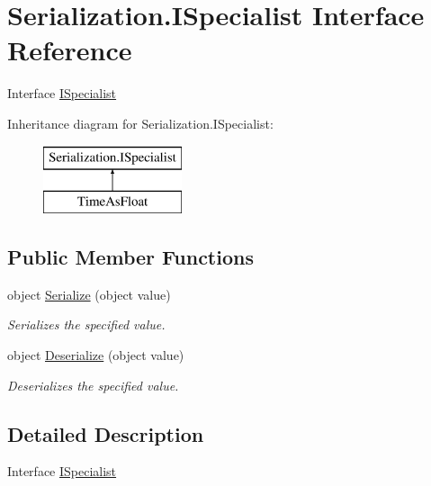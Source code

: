 \hypertarget{interface_serialization_1_1_i_specialist}{}\section{Serialization.\+I\+Specialist Interface Reference}
\label{interface_serialization_1_1_i_specialist}


Interface \hyperlink{interface_serialization_1_1_i_specialist}{I\+Specialist}  


Inheritance diagram for Serialization.\+I\+Specialist\+:\begin{figure}[H]
\begin{center}
\leavevmode
\includegraphics[height=2.000000cm]{interface_serialization_1_1_i_specialist}
\end{center}
\end{figure}
\subsection*{Public Member Functions}
\begin{DoxyCompactItemize}
\item 
object \hyperlink{interface_serialization_1_1_i_specialist_adf11f6ab173de9fe3c26e3cbee292c92}{Serialize} (object value)
\begin{DoxyCompactList}\small\item\em Serializes the specified value. \end{DoxyCompactList}\item 
object \hyperlink{interface_serialization_1_1_i_specialist_a90d5a229aacd71121934630932df0f1a}{Deserialize} (object value)
\begin{DoxyCompactList}\small\item\em Deserializes the specified value. \end{DoxyCompactList}\end{DoxyCompactItemize}


\subsection{Detailed Description}
Interface \hyperlink{interface_serialization_1_1_i_specialist}{I\+Specialist} 



